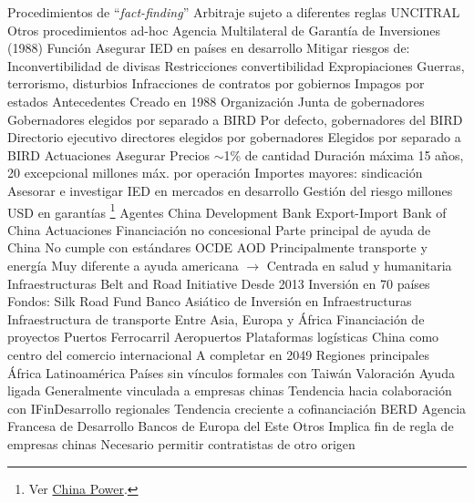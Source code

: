 \documentclass{nuevotema}
\begin{document}
\begin{esquemal}
				\4[] Procedimientos de ``\textit{fact-finding}''
				\4 Arbitraje sujeto a diferentes reglas
				\4[] UNCITRAL
				\4[] Otros procedimientos ad-hoc
		\2 Agencia Multilateral de Garantía de Inversiones (1988)
			\3 Función
				\4 Asegurar IED en países en desarrollo
				\4 Mitigar riesgos de:
				\4[] Inconvertibilidad de divisas
				\4[] Restricciones convertibilidad
				\4[] Expropiaciones
				\4[] Guerras, terrorismo, disturbios
				\4[] Infracciones de contratos por gobiernos
				\4[] Impagos por estados
			\3 Antecedentes
				\4 Creado en 1988
			\3 Organización
				\4 Junta de gobernadores
				\4[] Gobernadores elegidos por separado a BIRD
				\4[] Por defecto, gobernadores del BIRD
				\4 Directorio ejecutivo
				 directores elegidos por gobernadores
				\4[] Elegidos por separado a BIRD
			\3 Actuaciones
				\4 Asegurar
				\4[] Precios $\sim$1\% de cantidad
				\4[] Duración máxima 15 años, 20 excepcional
				 millones máx. por operación
				\4[] Importes mayores: sindicación
				\4 Asesorar e investigar
				\4[] IED en mercados en desarrollo
				\4[] Gestión del riesgo
				 millones USD en garantías
	\1 \footnote{Ver \href{https://chinapower.csis.org/china-development-finance/}{China Power}.}
		\2 Agentes
			\3 China Development Bank
			\3 Export-Import Bank of China
		\2 Actuaciones
			\3 Financiación no concesional
				\4 Parte principal de ayuda de China
				\4 No cumple con estándares OCDE
			\3 AOD
				\4 Principalmente transporte y energía
				\4[] Muy diferente a ayuda americana
				\4[] $\to$ Centrada en salud y humanitaria
			\3 Infraestructuras
			\3 Belt and Road Initiative
				\4 Desde 2013
				\4 Inversión en 70 países
				\4 Fondos:
				\4[] Silk Road Fund
				\4[] Banco Asiático de Inversión en Infraestructuras
				\4 Infraestructura de transporte
				\4[] Entre Asia, Europa y África
				\4 Financiación de proyectos
				\4[] Puertos
				\4[] Ferrocarril
				\4[] Aeropuertos
				\4[] Plataformas logísticas
				\4 China como centro del comercio internacional
				\4 A completar en 2049
			\3 Regiones principales
				\4 África
				\4 Latinoamérica
				\4 Países sin vínculos formales con Taiwán
		\2 Valoración
			\3 Ayuda ligada
				\4 Generalmente vinculada a empresas chinas
			\3 Tendencia hacia colaboración con IFinDesarrollo regionales
				\4 Tendencia creciente a cofinanciación
				\4[] BERD
				\4[] Agencia Francesa de Desarrollo
				\4[] Bancos de Europa del Este
				\4[] Otros
				\4 Implica fin de regla de empresas chinas
				\4[] Necesario permitir contratistas de otro origen

\end{esquemal}
\end{document}
